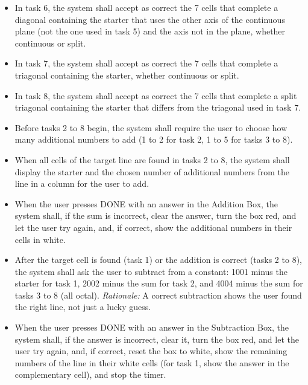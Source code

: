\documentclass[12pt]{article}
\newcounter{reqnum} %
\begin{document}
\begin{itemize}
\item[FR\refstepcounter{reqnum}\thereqnum \label{FR_Task6}:] In task 6, the system shall accept as correct the 7 cells that complete a diagonal containing the starter that uses the other axis of the continuous plane (not the one used in task 5) and the axis not in the plane, whether continuous or split.
 
\item[FR\refstepcounter{reqnum}\thereqnum \label{FR_Task7}:] In task 7, the system shall accept as correct the 7 cells that complete a triagonal containing the starter, whether continuous or split.
 
\item[FR\refstepcounter{reqnum}\thereqnum \label{FR_Task8}:] In task 8, the system shall accept as correct the 7 cells that complete a split triagonal containing the starter that differs from the triagonal used in task 7.
 
\item[FR\refstepcounter{reqnum}\thereqnum \label{FR_ChooseExtra}:] Before tasks 2 to 8 begin, the system shall require the user to choose how many additional numbers to add (1 to 2 for task 2, 1 to 5 for tasks 3 to 8).
 
\item[FR\refstepcounter{reqnum}\thereqnum \label{FR_AdditionColumn}:] When all cells of the target line are found in tasks 2 to 8, the system shall display the starter and the chosen number of additional numbers from the line in a column for the user to add.
 
\item[FR\refstepcounter{reqnum}\thereqnum \label{FR_AdditionCheck}:] When the user presses DONE with an answer in the Addition Box, the system shall, if the sum is incorrect, clear the answer, turn the box red, and let the user try again, and, if correct, show the additional numbers in their cells in white.
 
\item[FR\refstepcounter{reqnum}\thereqnum \label{FR_SubtractionPrompt}:] After the target cell is found (task 1) or the addition is correct (tasks 2 to 8), the system shall ask the user to subtract from a constant: 1001 minus the starter for task 1, 2002 minus the sum for task 2, and 4004 minus the sum for tasks 3 to 8 (all octal). \newline \textit{Rationale:} A correct subtraction shows the user found the right line, not just a lucky guess.
 
\item[FR\refstepcounter{reqnum}\thereqnum \label{FR_SubtractionCheck}:] When the user presses DONE with an answer in the Subtraction Box, the system shall, if the answer is incorrect, clear it, turn the box red, and let the user try again, and, if correct, reset the box to white, show the remaining numbers of the line in their white cells (for task 1, show the answer in the complementary cell), and stop the timer.
 

\end{itemize}
\end{document}

